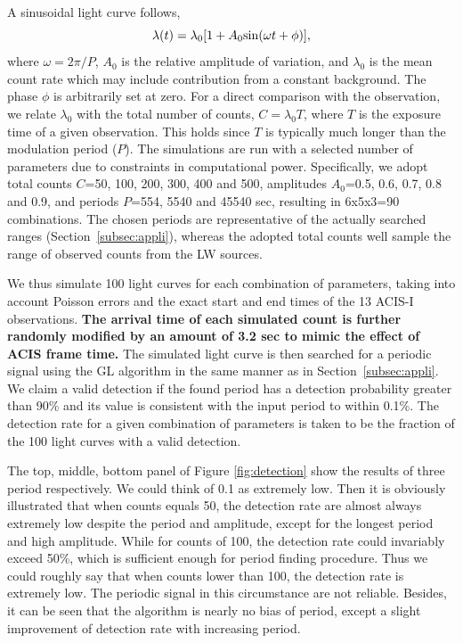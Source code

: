 \documentclass[twoside,twocolumn]{aastex63}
\begin{document}
A sinusoidal light curve follows,
\begin{equation}
\lambda (t)=\lambda_0[1+A_{0}{\rm sin}(\omega t+\phi)], 
\label{eqn:sin}
\end{equation}
where $\omega = 2{\pi}/P$, $A_0$ is the relative amplitude of variation, and $\lambda_0$ is the mean count rate which may include contribution from a constant background. The phase $\phi$ is arbitrarily set at zero.
For a direct comparison with the observation, we relate $\lambda_0$ with the total number of counts, $C = \lambda_0 T$, where $T$ is the exposure time of a given observation. This holds since $T$ is typically much longer than the modulation period ($P$). 
The simulations are run with a selected number of parameters due to constraints in computational power. 
Specifically, we adopt total counts $C$=50, 100, 200, 300, 400 and 500, amplitudes $A_0$=0.5, 0.6, 0.7, 0.8 and 0.9, and periods $P$=554, 5540 and 45540 sec, resulting in 6x5x3=90 combinations. 
The chosen periods are representative of the actually searched ranges (Section~\ref{subsec:appli}), whereas
the adopted total counts well sample the range of observed counts from the LW sources.

We thus simulate 100 light curves for each combination of parameters, taking into account Poisson errors and the exact start and end times of the 13 ACIS-I observations. 
{\bf The arrival time of each simulated count is further randomly modified by an amount of 3.2 sec to mimic the effect of ACIS frame time.}
The simulated light curve is then searched for a periodic signal using the GL algorithm in the same manner as in Section~\ref{subsec:appli}.
We claim a valid detection if the found period has a detection probability greater than 90\% and its value is consistent with the input period to within 0.1\%. 
The detection rate for a given combination of parameters is taken to be the fraction of the 100 light curves with a valid detection.

The top, middle, bottom panel of Figure \ref{fig:detection} show the results of three period respectively. 
We could think of 0.1 as extremely low. Then it is obviously illustrated that when counts equals 50, the detection rate are almost always extremely low despite the period and amplitude, except for the longest period and high amplitude. While for counts of 100, the detection rate could invariably exceed 50\%, which is sufficient enough for period finding procedure. Thus we could roughly say that when counts lower than 100, the detection rate is extremely low. The periodic signal in this circumstance are not reliable. Besides, it can be seen that the algorithm is nearly no bias of period, except a slight improvement of detection rate with increasing period.
 
\end{document}
